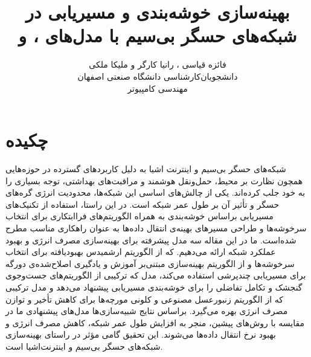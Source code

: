 \documentclass[11.5pt,onecolumn,a4paper]{article}
\begin{document}
	
	\title{بهینه‌سازی خوشه‌بندی و مسیر‌یابی در شبکه‌های حسگر بی‌سیم با مدل‌های ،  و } 
	\author{فائزه قیاسی ، رانیا کارگر و ملیکا ملکی\\
		دانشجویان‌کارشناسی دانشگاه صنعتی اصفهان\\
		مهندسی کامپیوتر}
	\date{}
	\maketitle
	\thispagestyle{empty}
	\vfill
	\section*{چکیده}
	شبکه‌های حسگر بی‌سیم و اینترنت‌ اشیا به دلیل کاربردهای گسترده در حوزه‌هایی همچون نظارت بر محیط، حمل‌ونقل هوشمند و مراقبت‌های بهداشتی، توجه بسیاری را به خود جلب کرده‌اند. یکی از چالش‌های اساسی این شبکه‌ها، محدودیت انرژی گره‌های حسگر و تأثیر آن بر طول عمر شبکه است. در این راستا، استفاده از تکنیک‌های مسیریابی براساس خوشه‌بندی به‌ همراه الگوریتم‌های فراابتکاری برای انتخاب سرخوشه‌ها و طراحی مسیرهای بهینه‌ی انتقال داده‌ها به عنوان راهکاری مناسب مطرح شده‌است. ما در این مقاله سه مدل پیشرفته برای بهینه‌سازی مصرف انرژی و بهبود عملکرد شبکه ارائه می‌دهیم.  که از الگوریتم ارشمیدس بهبودیافته برای انتخاب سرخوشه‌ها و از الگوریتم بهینه‌سازی مبتنی‌بر آموزش و یادگیری اصلاح‌شده‌ی دورگه برای مسیریابی چندپرشی استفاده می‌کند، مدل  که ترکیبی از الگوریتم‌های جست‌وجوی گنجشک و تکامل تفاضلی را برای خوشه‌بندی مسیریابی پیشنهاد می‌دهد و مدل ترکیبی  که از الگوریتم زنبورعسل مصنوعی و کلونی مورچه‌ها برای کاهش تأخیر و توازن مصرف انرژی بهره می‌گیرد. براساس نتایج شبیه‌سازی‌ها مدل‌های پیشنهادی ما در مقایسه با روش‌های پیشین، منجر به افزایش طول عمر شبکه، کاهش مصرف انرژی و بهبود نرخ انتقال داده‌ها می‌شوند. این تحقیق گامی مؤثر در راستای بهینه‌سازی شبکه‌های حسگر بی‌سیم و اینترنت‌اشیا است.
	
	\clearpage
	\newpage
\end{document}
